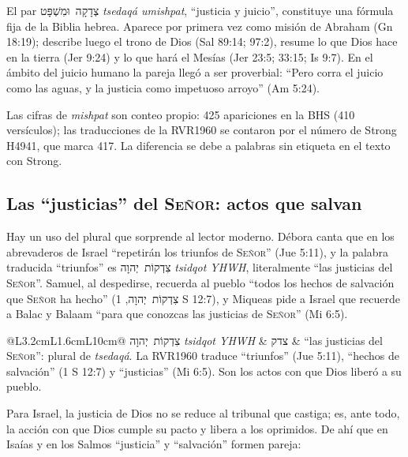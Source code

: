 \documentclass[11pt,letterpaper]{article}
\newcommand{\heb}[1]{\mbox{\foreignlanguage{hebrew}{#1}}}
\newcommand{\SENOR}{\textsc{Señor}}
\begin{document}
El par \heb{צְדָקָה וּמִשְׁפָּט} \emph{tsedaqá umishpat}, ``justicia y juicio'', constituye una fórmula fija de la Biblia hebrea. Aparece por primera vez como misión de Abraham (Gn 18:19); describe luego el trono de Dios (Sal 89:14; 97:2), resume lo que Dios hace en la tierra (Jer 9:24) y lo que hará el Mesías (Jer 23:5; 33:15; Is 9:7). En el ámbito del juicio humano la pareja llegó a ser proverbial: ``Pero corra el juicio como las aguas, y la justicia como impetuoso arroyo'' (Am 5:24).

\begin{nota}[Precisión]
Las cifras de \emph{mishpat} son conteo propio: 425 apariciones en la BHS (410 versículos); las traducciones de la RVR1960 se contaron por el número de Strong H4941, que marca 417. La diferencia se debe a palabras sin etiqueta en el texto con Strong.
\end{nota}

\subsection{Las ``justicias'' del \SENOR: actos que salvan}
Hay un uso del plural que sorprende al lector moderno. Débora canta que en los abrevaderos de Israel ``repetirán los triunfos de \SENOR'' (Jue 5:11), y la palabra traducida ``triunfos'' es \heb{צִדְקוֹת יְהוָה} \emph{tsidqot YHWH}, literalmente ``las justicias del \SENOR''. Samuel, al despedirse, recuerda al pueblo ``todos los hechos de salvación que \SENOR{} ha hecho'' (\heb{צִדְקוֹת יְהוָה}, 1 S 12:7), y Miqueas pide a Israel que recuerde a Balac y Balaam ``para que conozcas las justicias de \SENOR'' (Mi 6:5).

\begin{filologia}[Jue 5:11; 1 S 12:7; Mi 6:5]
\begin{tabular}{@{}L{3.2cm}L{1.6cm}L{10cm}@{}}
\heb{צִדְקוֹת יְהוָה} \emph{tsidqot YHWH} & \heb{צדק} & ``las justicias del \SENOR'': plural de \emph{tsedaqá}. La RVR1960 traduce ``triunfos'' (Jue 5:11), ``hechos de salvación'' (1 S 12:7) y ``justicias'' (Mi 6:5). Son los actos con que Dios liberó a su pueblo. \\
\end{tabular}
\end{filologia}

Para Israel, la justicia de Dios no se reduce al tribunal que castiga; es, ante todo, la acción con que Dios cumple su pacto y libera a los oprimidos. De ahí que en Isaías y en los Salmos ``justicia'' y ``salvación'' formen pareja:
\end{document}
